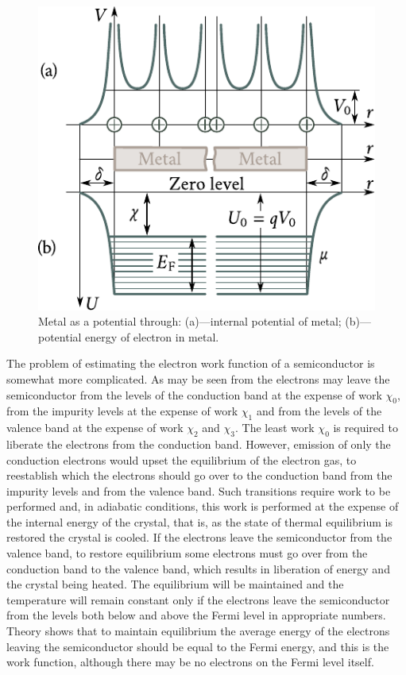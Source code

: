 \begin{figure}[t]
	\begin{center}
		\includegraphics[scale=1]{figures/ch_08/fig_8_1.pdf}
		\caption[]{Metal as a potential through: (a)---internal potential of metal; (b)---potential energy of electron in metal.}
		\label{fig:8_1}
	\end{center}
	\vspace{-0.8cm}
\end{figure}

The problem of estimating the electron work function of a semiconductor is somewhat more complicated. As may be seen from  the electrons may leave the semiconductor from the levels of the conduction band at the expense of work $\chi_0$, from the impurity levels at the expense of work $\chi_1$ and from the levels of the valence band at the
expense of work $\chi_2$ and $\chi_3$. The least work $\chi_0$ is required to liberate the electrons from the conduction band. However, emission of only the conduction electrons would upset the equilibrium of the electron gas, to reestablish which the electrons should go over to the conduction band from the impurity levels and from the valence band. Such transitions require work to be performed and, in adiabatic conditions, this work is performed at the expense of the internal energy of the crystal, that is, as the state of thermal equilibrium is restored the crystal is cooled. If the electrons leave the semiconductor from the valence band, to restore equilibrium some electrons must go over from the conduction band to the valence band, which results in liberation of energy and the crystal being heated. The equilibrium will be maintained and the temperature will remain constant only if the electrons
leave the semiconductor from the levels both below and above the Fermi level in appropriate numbers. Theory shows that to maintain equilibrium the average energy of the electrons leaving the semiconductor should be equal to the Fermi energy, and this is the work function, although there may be no electrons on the Fermi level itself.

